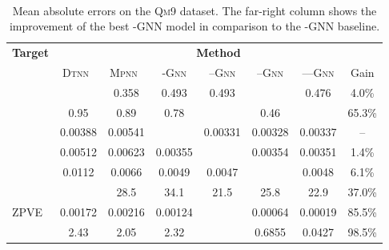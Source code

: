 \documentclass[letterpaper]{article}
\theoremstyle{definition}
\begin{document}
\begin{table*}[t]\
	\caption{Mean absolute errors on the \textsc{Qm9} dataset. The far-right column shows the improvement of the best -GNN model in comparison to the -GNN baseline.
	}\label{fig:qm9_results}
	\renewcommand{\arraystretch}{1.0}
	\centering
	\begin{tabular}{lccccccc}
		\toprule
		\multirow{3}{*}{\vspace*{8pt}\textbf{Target}} & \multicolumn{7}{c}{\textbf{Method}} \\
		\cmidrule{2-8}
		                            & \!\!\!\textsc{Dtnn}~\cite{Wu+2018}\!\! & \!\!\textsc{Mpnn}~\cite{Wu+2018}\!\!\! & \textsc{-Gnn}   & \!\textsc{--Gnn} & \textsc{--Gnn} & \textsc{---Gnn}\! & Gain   \\
		\midrule
		                       &                        & 0.358                                  & 0.493              & 0.493                  &      & 0.476                      & 4.0\%  \\
		                    & 0.95                                   & 0.89                                   & 0.78               &         & 0.46                 &             & 65.3\% \\
		 & 0.00388                                & 0.00541                                &  & 0.00331                & 0.00328              & 0.00337                    & --     \\
		 & 0.00512                                & 0.00623                                & 0.00355            &      & 0.00354              & 0.00351                    & 1.4\%  \\
		         & 0.0112                                 & 0.0066                                 & 0.0049             & 0.0047                 &     & 0.0048                     & 6.1\%  \\
		       &                         & 28.5                                   & 34.1               & 21.5                   & 25.8                 & 22.9                       & 37.0\% \\
		\textsc{ZPVE}               & 0.00172                                & 0.00216                                & 0.00124            &      & 0.00064              & 0.00019                    & 85.5\% \\
		                       & 2.43                                   & 2.05                                   & 2.32               &       & 0.6855               & 0.0427                     & 98.5\% \\

\end{tabular}
\end{table*}
\end{document}
